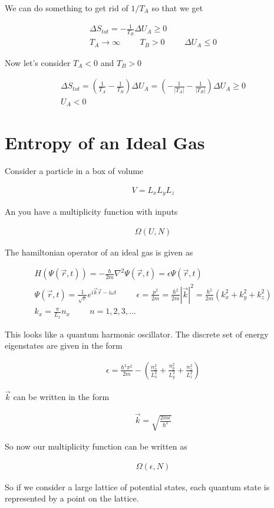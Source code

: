 \documentclass[fleqn]{report}
\newcommand{\hp}{\hspace{1cm}}
\newcommand{\equations} [1] {
\begin{gather*}
#1
\end{gather*}
}
\begin{document}
We can do something to get rid of $1/T_A$ so that we get 

\equations{
    \Delta S_{tot}
    =
    -
    \frac{1}{T_B}
    \Delta U_A
    \geq 
    0
    \\
    T_A \to \infty 
    \hp 
    T_B > 0 
    \hp 
    \Delta U_A \leq 0
}

Now let's consider $T_A < 0$ and $T_B > 0$ 

\equations{
    \Delta S_{tot}
    =
    \left(
        \frac{1}{T_A}
        -
        \frac{1}{T_B}
    \right)
    \Delta U_A 
    =
    \left(
        -
        \frac{1}{|T_A|}
        -
        \frac{1}{|T_B|}
    \right)
    \Delta U_A 
    \geq 0
    \\
    U_A < 0
}

\section{Entropy of an Ideal Gas}
Consider a particle in a box of volume 
\equations{
    V 
    =
    L_x
    L_y
    L_z
}

An you have a multiplicity function with inputs 
\equations{
    \Omega(U, N)
}

The hamiltonian operator of an ideal gas is given as 
\equations{
    H(\Psi(\vec r, t))
    =
    -
    \frac{\hbar}{2m}
    \nabla^2 
    \Psi(\vec r, t)
    =
    \epsilon 
    \Psi(\vec r, t)
    \\
    \Psi(\vec r, t)
    =
    \frac{1}{\sqrt{v}}
    e^{i \vec k \vec r - i \omega t}
    \hp 
    \epsilon 
    =
    \frac{p^2}{2m}
    =
    \frac{\hbar^2}{2m}
    |\vec k|^2
    =
    \frac{\hbar^2}{2m}
    (k_x^2 + k_y^2 + k_z^2)
    \\
    k_x 
    =
    \frac{\pi}{L_x} n_x 
    \hp 
    n 
    =
    1, 2, 3, \ldots
}

This looks like a quantum harmonic oscillator. 
The discrete set of energy eigenstates are given in the form 

\equations{
    \epsilon 
    =
    \frac{\hbar^2 \pi^2}{2m}
    -
    \left(
        \frac{n_x^2}{L_x^2}
        +
        \frac{n_y^2}{L_y^2}
        +
        \frac{n_z^2}{L_z^2}
    \right)
}

$\vec k$ can be written in the form 
\equations{
    \vec k 
    =
    \sqrt{
        \frac{2 m \epsilon}{\hbar^2}
    }
}

So now our multiplicity function can be written as 
\equations{
    \Omega(\epsilon, N)
}

So if we consider a large lattice of potential states, each quantum 
state is represented by a point on the lattice. 
\end{document}
